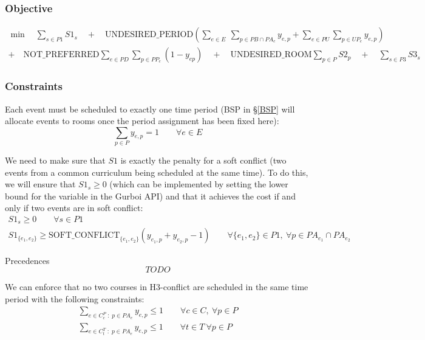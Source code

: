 \documentclass{article}
\theoremstyle{plain}
\numberwithin{theorem}{section}
\numberwithin{example}{section}
\theoremstyle{definition}
\begin{document}
\subsubsection*{Objective}
\begin{multline}
    \min \quad \sum_{s \in P1} S1_s \quad + \quad \text{UNDESIRED\_PERIOD}
        \left( \sum_{e \in E} \ \sum_{p \in PB \cap PA_e} y_{e, p} +
        \sum_{e \in PU} \sum_{p \in UP_e} y_{e, p} \right) \\
    + \quad \text{NOT\_PREFERRED} \sum_{e \in PD} \sum_{p \in PP_e} (1 - y_{ep})
        \quad + \quad \text{UNDESIRED\_ROOM} \sum_{p \in P} S2_p \quad + \quad
        \sum_{s \in P3} S3_s
\end{multline}

\subsubsection*{Constraints}
Each event must be scheduled to exactly one time period (BSP in \S\ref{BSP} will
allocate events to rooms once the period assignment has been fixed here):
\begin{equation}
    \sum_{p \in P} y_{e,p} = 1 \qquad \forall e \in E
\end{equation}

We need to make sure that $S1$ is exactly the penalty for a soft conflict (two
events from a common curriculum being scheduled at the same time). To do this,
we will ensure that $S1_s \geq 0$ (which can be implemented by setting the lower
bound for the variable in the Gurboi API) and that it achieves the cost if and
only if two events are in soft conflict:
\begin{gather}
    S1_s \geq 0 \qquad \forall s \in P1 \\
    S1_{\{e_1, e_2\}} \geq \text{SOFT\_CONFLICT}_{\{e_1, e_2\}}
        (y_{e_1, p} + y_{e_2, p} - 1) \qquad \forall \{e_1, e_2\} \in P1, \
        \forall p \in PA_{e_1} \cap PA_{e_2}
\end{gather}

Precedences
\begin{equation}
    TODO
\end{equation}

We can enforce that no two courses in H3-conflict are scheduled in the same time
period with the following constraints:
\begin{gather}
    \sum_{e \in C^P_c \; : \; p \in PA_e} y_{e,p} \leq 1
        \qquad \forall c \in C, \ \forall p \in P \\
    \sum_{e \in C^T_t \; : \; p \in PA_e} y_{e, p} \leq 1
        \qquad \forall t \in T \ \forall p \in P
\end{gather}
\end{document}
